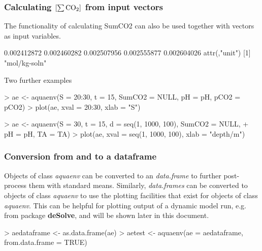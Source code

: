 \documentclass[article,nojss]{jss}
\newcommand{\R}{\proglang{R }}
\newcommand{\ds}{\textbf{\textsf{deSolve}}}
\begin{document}
\subsubsection{Calculating $\rm [\sum CO_2]$ from input vectors}

The functionality of calculating SumCO2 can also be used together with vectors as input variables.

\begin{Schunk}
\begin{Soutput}
[1] 0.002412872 0.002460282 0.002507956 0.002555877 0.002604026
attr(,"unit")
[1] "mol/kg-soln"
\end{Soutput}
\end{Schunk}

Two further examples

\begin{Schunk}
\begin{Sinput}
> ae <- aquaenv(S = 20:30, t = 15, SumCO2 = NULL, pH = pH, pCO2 = pCO2)
> plot(ae, xval = 20:30, xlab = "S")
\end{Sinput}
\end{Schunk}

\begin{Schunk}
\begin{Sinput}
> ae <- aquaenv(S = 30, t = 15, d = seq(1, 1000, 100), SumCO2 = NULL, 
+     pH = pH, TA = TA)
> plot(ae, xval = seq(1, 1000, 100), xlab = "depth/m")
\end{Sinput}
\end{Schunk}



\subsubsection{Conversion from and to a dataframe}
Objects of class \textit{aquaenv} can be converted to an \R \textit{data.frame} to further post-process them with standard
\R means. Similarly, \R \textit{data.frames} can be converted to objects of class \textit{aquaenv} to use the plotting 
facilities that exist for objects of class \textit{aquaenv}. This can be helpful for plotting output of a dynamic model run, e.g. from \R package \ds,
and will be shown later in this document.

\begin{Schunk}
\begin{Sinput}
> aedataframe <- as.data.frame(ae)
> aetest <- aquaenv(ae = aedataframe, from.data.frame = TRUE)
\end{Sinput}
\end{Schunk}
\end{document}
